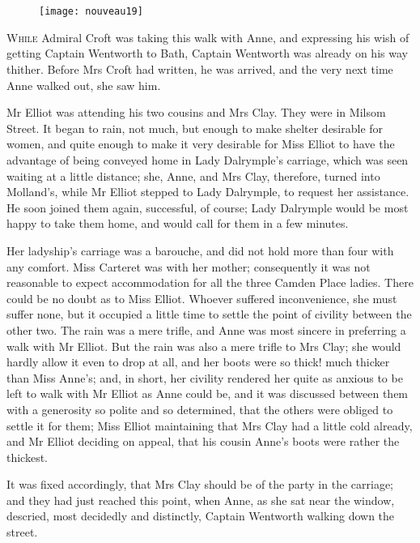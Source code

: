 \chapter[Chapter \thechapter]{}

\begin{figure}[t!]
\centering
\texttt{[image: nouveau19]}
\end{figure}

\lettrine[lines=4,lraise=0.3]{W}{hile} Admiral Croft was taking this walk with Anne, and expressing his wish of getting Captain Wentworth to Bath, Captain Wentworth was already on his way thither. Before Mrs Croft had written, he was arrived, and the very next time Anne walked out, she saw him.

Mr Elliot was attending his two cousins and Mrs Clay. They were in Milsom Street. It began to rain, not much, but enough to make shelter desirable for women, and quite enough to make it very desirable for Miss Elliot to have the advantage of being conveyed home in Lady Dalrymple's carriage, which was seen waiting at a little distance; she, Anne, and Mrs Clay, therefore, turned into Molland's, while Mr Elliot stepped to Lady Dalrymple, to request her assistance. He soon joined them again, successful, of course; Lady Dalrymple would be most happy to take them home, and would call for them in a few minutes.

Her ladyship's carriage was a barouche, and did not hold more than four with any comfort. Miss Carteret was with her mother; consequently it was not reasonable to expect accommodation for all the three Camden Place ladies. There could be no doubt as to Miss Elliot. Whoever suffered inconvenience, she must suffer none, but it occupied a little time to settle the point of civility between the other two. The rain was a mere trifle, and Anne was most sincere in preferring a walk with Mr Elliot. But the rain was also a mere trifle to Mrs Clay; she would hardly allow it even to drop at all, and her boots were so thick! much thicker than Miss Anne's; and, in short, her civility rendered her quite as anxious to be left to walk with Mr Elliot as Anne could be, and it was discussed between them with a generosity so polite and so determined, that the others were obliged to settle it for them; Miss Elliot maintaining that Mrs Clay had a little cold already, and Mr Elliot deciding on appeal, that his cousin Anne's boots were rather the thickest.

It was fixed accordingly, that Mrs Clay should be of the party in the carriage; and they had just reached this point, when Anne, as she sat near the window, descried, most decidedly and distinctly, Captain Wentworth walking down the street.

